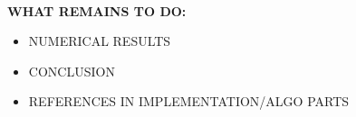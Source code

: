 \documentclass[letter,11pt]{article}
\begin{document}
\vfill 

\tableofcontents

~\vfill

\textbf{WHAT REMAINS TO DO:}
\begin{itemize}
\item NUMERICAL RESULTS
\item CONCLUSION
\item REFERENCES IN IMPLEMENTATION/ALGO PARTS
\end{itemize}

%










%


\vfill



\end{document}
